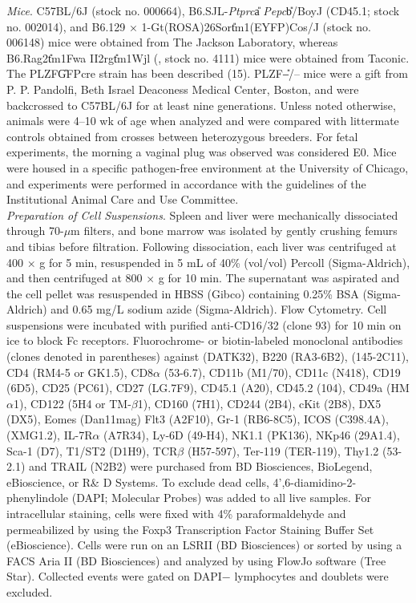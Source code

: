 \textit{Mice}. C57BL/6J (stock no. 000664), B6.SJL-\textit{Ptprc}\U{a} \textit{Pepc}\U{b}/BoyJ (CD45.1; stock no. 002014), and B6.129 × 1-Gt(ROSA)26Sor\U{tm1(EYFP)Cos}/J (stock no. 006148) mice were obtained from The Jackson Laboratory, whereas B6.Rag2\U{tm1Fwa} II2rg\U{tm1Wjl} (\Ragrg, stock no. 4111) mice were obtained from Taconic. The PLZF\U{GFPcre} strain has been described (15). PLZF\U{--/--} mice were a gift from P. P. Pandolfi, Beth Israel Deaconess Medical Center, Boston, and were backcrossed to C57BL/6J for at least nine generations. Unless noted otherwise, animals were 4–10 wk of age when analyzed and were compared with littermate controls obtained from crosses between heterozygous breeders. For fetal experiments, the morning a vaginal plug was observed was considered E0. Mice were housed in a specific pathogen-free environment at the University of Chicago, and experiments were performed in accordance with the guidelines of the Institutional Animal Care and Use Committee.
\\
\textit{Preparation of Cell Suspensions}. Spleen and liver were mechanically dissociated through 70-$\mu$m filters, and bone marrow was isolated by gently crushing femurs and tibias before filtration. Following dissociation, each liver was centrifuged at 400 × g for 5 min, resuspended in 5 mL of 40\% (vol/vol) Percoll (Sigma-Aldrich), and then centrifuged at 800 × g for 10 min. The supernatant was aspirated and the cell pellet was resuspended in HBSS (Gibco) containing 0.25\% BSA (Sigma-Aldrich) and 0.65 mg/L sodium azide (Sigma-Aldrich).
Flow Cytometry. Cell suspensions were incubated with purified anti-CD16/32 (clone 93) for 10 min on ice to block Fc receptors. Fluorochrome- or biotin-labeled monoclonal antibodies (clones denoted in parentheses) against \ab{} (DATK32), B220 (RA3-6B2), \CDte{} (145-2C11), CD4 (RM4-5 or GK1.5), CD8$\alpha$ (53-6.7), CD11b (M1/70), CD11c (N418), CD19 (6D5), CD25 (PC61), CD27 (LG.7F9), CD45.1 (A20), CD45.2 (104), CD49a (HM$\alpha$1), CD122 (5H4 or TM-$\beta$1), CD160 (7H1), CD244 (2B4), cKit (2B8), DX5 (DX5), Eomes (Dan11mag) Flt3 (A2F10), Gr-1 (RB6-8C5), ICOS (C398.4A), \IFNg (XMG1.2), IL-7R$\alpha$ (A7R34), Ly-6D (49-H4), NK1.1 (PK136), NKp46 (29A1.4), Sca-1 (D7), T1/ST2 (D1H9), TCR$\beta$ (H57-597), Ter-119 (TER-119), Thy1.2 (53-2.1) and TRAIL (N2B2) were purchased from BD Biosciences, BioLegend, eBioscience, or R\& D Systems. To exclude dead cells, 4',6-diamidino-2-phenylindole (DAPI; Molecular Probes) was added to all live samples. For intracellular staining, cells were fixed with 4\% paraformaldehyde and permeabilized by using the Foxp3 Transcription Factor Staining Buffer Set (eBioscience). Cells were run on an LSRII (BD Biosciences) or sorted by using a FACS Aria II (BD Biosciences) and analyzed by using FlowJo software (Tree Star). Collected events were gated on DAPI− lymphocytes and doublets were excluded.
